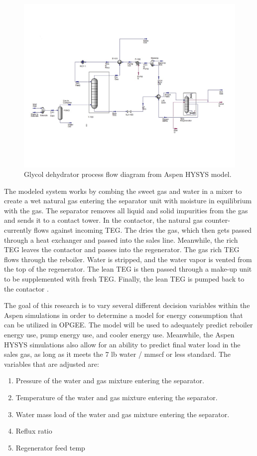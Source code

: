 \documentclass[11pt]{report}
\begin{document}
\begin{figure}[t]
\includegraphics[width=1.1\columnwidth]{images/DehydrationPFD.pdf}
\caption{Glycol dehydrator process flow diagram from Aspen HYSYS model.}
\label{fig:dehyPFDaspen}
\end{figure}

The modeled system works by combing the sweet gas and water in a mixer to create a wet natural gas entering the separator unit with moisture in equilibrium with the gas. The separator removes all liquid and solid impurities from the gas and sends it to a contact tower. In the contactor, the natural gas counter-currently flows against incoming TEG. The dries the gas, which then gets passed through a heat exchanger and passed into the sales line. Meanwhile, the rich TEG leaves the contactor and passes into the regenerator. The gas rich TEG flows through the reboiler. Water is stripped, and the water vapor is vented from the top of the regenerator. The lean TEG is then passed through a make-up unit to be supplemented with fresh TEG. Finally, the lean TEG is pumped back to the contactor \cite{Manning1991}. 

The goal of this research is to vary several different decision variables within the Aspen simulations in order to determine a model for energy consumption that can be utilized in OPGEE. The model will be used to adequately predict reboiler energy use, pump energy use, and cooler energy use. Meanwhile, the Aspen HYSYS simulations also allow for an ability to predict final water load in the sales gas, as long as it meets the 7 lb water / mmscf or less standard. The variables that are adjusted are:
\begin{enumerate}
\item Pressure of the water and gas mixture entering the separator. 
\item Temperature of the water and gas mixture entering the separator.
\item Water mass load of the water and gas mixture entering the separator.
\item Reflux ratio
\item Regenerator feed temp
\end{enumerate}
\end{document}
